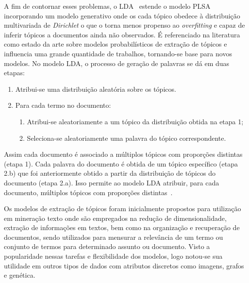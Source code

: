 A fim de contornar esses problemas, o LDA~\cite{Blei2003} estende o modelo PLSA incorporando um modelo generativo onde os cada tópico obedece à distribuição multivariada de \textit{Dirichlet} o que o torna menos propenso ao \textit{overfitting} e capaz de inferir tópicos a documentos ainda não observados. É referenciado na literatura como estado da arte sobre modelos probabilísticos de extração de tópicos e influencia uma grande quantidade de trabalhos, tornando-se base para novos modelos. No modelo LDA, o processo de geração de palavras se dá em duas etapas:

\begin{enumerate}
	\item Atribui-se uma distribuição aleatória sobre os tópicos.
	\item Para cada termo no documento:
		\begin{enumerate}
			\item Atribui-se aleatoriamente a um tópico da distribuição obtida na etapa 1;
			\item Seleciona-se aleatoriamente uma palavra do tópico correspondente.
		\end{enumerate}
\end{enumerate}

Assim cada documento é associado a múltiplos tópicos com proporções distintas (etapa 1). Cada palavra do documento é obtida de um tópico específico (etapa 2.b) que foi anteriormente obtido a partir da distribuição de tópicos do documento (etapa 2.a). Isso permite ao modelo LDA atribuir, para cada documento, múltiplos tópicos com proporções distintas~\cite{Blei2012}.

Os modelos de extração de tópicos foram inicialmente propostos para utilização em mineração texto onde são empregados na redução de dimensionalidade, extração de informações em textos, bem como na organização e recuperação de documentos, sendo utilizados para mensurar a relevância de um termo ou conjunto de termos para determinado assunto ou documento. Visto a popularidade nessas tarefas e flexibilidade dos modelos, logo notou-se sua utilidade em outros tipos de dados com atributos discretos como imagens, grafos e genética. 



